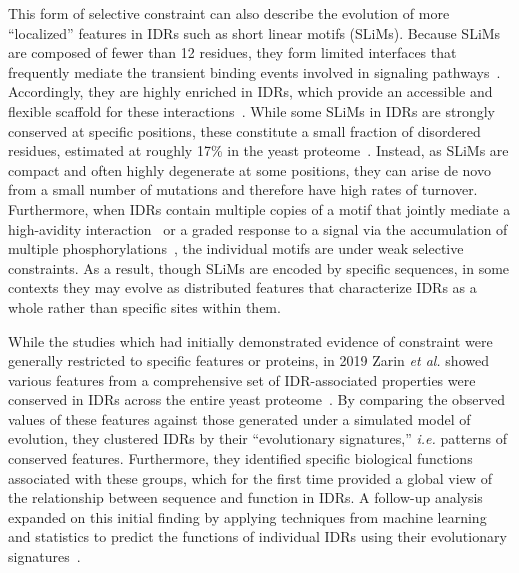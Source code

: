 This form of selective constraint can also describe the evolution of more ``localized'' features in IDRs such as short linear motifs (SLiMs). Because SLiMs are composed of fewer than 12 residues, they form limited interfaces that frequently mediate the transient binding events involved in signaling pathways~\cite{Tompa2014}. Accordingly, they are highly enriched in IDRs, which provide an accessible and flexible scaffold for these interactions~\cite{Fuxreiter2007, Davey2012}. While some SLiMs in IDRs are strongly conserved at specific positions, these constitute a small fraction of disordered residues, estimated at roughly 17\% in the yeast proteome~\cite{NguyenBa2012}. Instead, as SLiMs are compact and often highly degenerate at some positions, they can arise de novo from a small number of mutations and therefore have high rates of turnover. Furthermore, when IDRs contain multiple copies of a motif that jointly mediate a high-avidity interaction~\cite{Tompa2014} or a graded response to a signal via the accumulation of multiple phosphorylations~\cite{Wright2014}, the individual motifs are under weak selective constraints. As a result, though SLiMs are encoded by specific sequences, in some contexts they may evolve as distributed features that characterize IDRs as a whole rather than specific sites within them.

While the studies which had initially demonstrated evidence of constraint were generally restricted to specific features or proteins, in 2019 Zarin \textit{et al.} showed various features from a comprehensive set of IDR-associated properties were conserved in IDRs across the entire yeast proteome~\cite{Zarin2019}. By comparing the observed values of these features against those generated under a simulated model of evolution, they clustered IDRs by their ``evolutionary signatures,'' \textit{i.e.} patterns of conserved features. Furthermore, they identified specific biological functions associated with these groups, which for the first time provided a global view of the relationship between sequence and function in IDRs. A follow-up analysis expanded on this initial finding by applying techniques from machine learning and statistics to predict the functions of individual IDRs using their evolutionary signatures~\cite{Zarin2021}.

